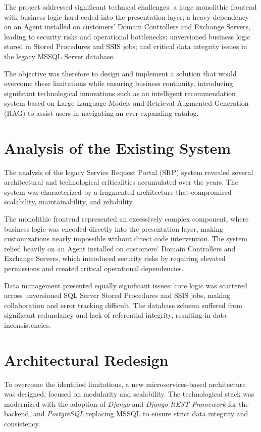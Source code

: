 The project addressed significant technical challenges: a huge monolithic frontend with business logic hard-coded into the presentation layer; a heavy dependency on an Agent installed on customers' Domain Controllers and Exchange Servers, leading to security risks and operational bottlenecks; unversioned business logic stored in Stored Procedures and SSIS jobs; and critical data integrity issues in the legacy MSSQL Server database.

The objective was therefore to design and implement a solution that would overcome these limitations while ensuring business continuity, introducing significant technological innovations such as an intelligent recommendation system based on Large Language Models and Retrieval-Augmented Generation (RAG) to assist users in navigating an ever-expanding catalog.

\section*{\normalsize Analysis of the Existing System}

The analysis of the legacy Service Request Portal (SRP) system revealed several architectural and technological criticalities accumulated over the years. The system was characterized by a fragmented architecture that compromised scalability, maintainability, and reliability.

The monolithic frontend represented an excessively complex component, where business logic was encoded directly into the presentation layer, making customizations nearly impossible without direct code intervention. The system relied heavily on an Agent installed on customers' Domain Controllers and Exchange Servers, which introduced security risks by requiring elevated permissions and created critical operational dependencies.

Data management presented equally significant issues: core logic was scattered across unversioned SQL Server Stored Procedures and SSIS jobs, making collaboration and error tracking difficult. The database schema suffered from significant redundancy and lack of referential integrity, resulting in data inconsistencies.

\section*{\normalsize Architectural Redesign}

To overcome the identified limitations, a new microservices-based architecture was designed, focused on modularity and scalability. The technological stack was modernized with the adoption of \textit{Django} and \textit{Django REST Framework} for the backend, and \textit{PostgreSQL} replacing MSSQL to ensure strict data integrity and consistency.

